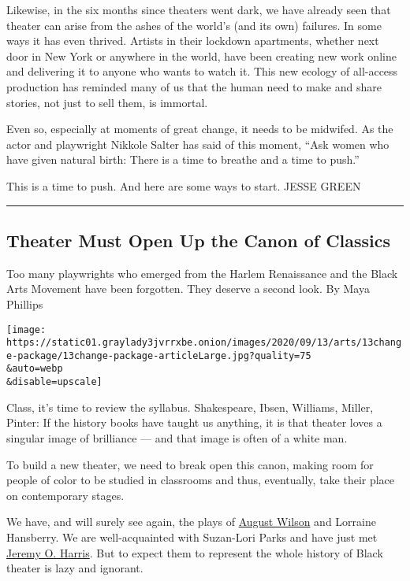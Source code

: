 Likewise, in the six months since theaters went dark, we have already
seen that theater can arise from the ashes of the world's (and its own)
failures. In some ways it has even thrived. Artists in their lockdown
apartments, whether next door in New York or anywhere in the world, have
been creating new work online and delivering it to anyone who wants to
watch it. This new ecology of all-access production has reminded many of
us that the human need to make and share stories, not just to sell them,
is immortal.

Even so, especially at moments of great change, it needs to be midwifed.
As the actor and playwright Nikkole Salter has said of this moment,
``Ask women who have given natural birth: There is a time to breathe and
a time to push.''

This is a time to push. And here are some ways to start. JESSE GREEN

\begin{center}\rule{0.5\linewidth}{\linethickness}\end{center}

\hypertarget{theater-must-open-up-the-canon-of-classics}{%
\subsection{Theater Must Open Up the Canon of
Classics}\label{theater-must-open-up-the-canon-of-classics}}

Too many playwrights who emerged from the Harlem Renaissance and the
Black Arts Movement have been forgotten. They deserve a second look. By
Maya Phillips

\texttt{[image: https://static01.graylady3jvrrxbe.onion/images/2020/09/13/arts/13change-package/13change-package-articleLarge.jpg?quality=75\\\&auto=webp\\\&disable=upscale]}

Class, it's time to review the syllabus. Shakespeare, Ibsen, Williams,
Miller, Pinter: If the history books have taught us anything, it is that
theater loves a singular image of brilliance --- and that image is often
of a white man.

To build a new theater, we need to break open this canon, making room
for people of color to be studied in classrooms and thus, eventually,
take their place on contemporary stages.

We have, and will surely see again, the plays of
\href{https://www.nytimes3xbfgragh.onion/2017/01/11/theater/what-august-wilson-means-now.html?searchResultPosition=1}{August
Wilson} and Lorraine Hansberry. We are well-acquainted with Suzan-Lori
Parks and have just met
\href{https://www.nytimes3xbfgragh.onion/2018/11/28/theater/jeremy-o-harris-slave-play.html?searchResultPosition=19}{Jeremy
O. Harris}. But to expect them to represent the whole history of Black
theater is lazy and ignorant.

